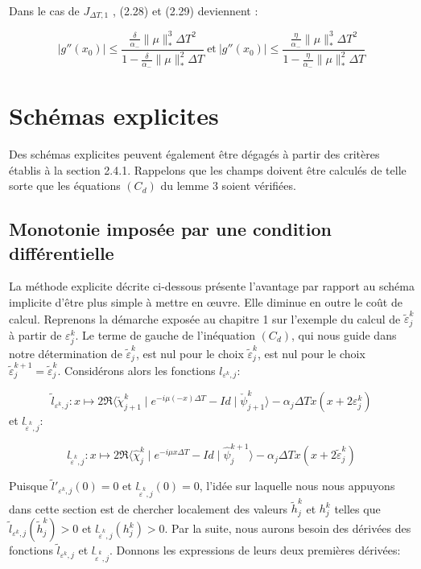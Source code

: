 Dans le cas de $ J_{\Delta T,1} $ , (2.28) et (2.29) deviennent :

$$ |g''(x_0)| \leq \frac{\frac{\delta}{\alpha_-}  \lVert \mu \rVert _*^3 \Delta T^2 }{1-\frac{\delta}{\alpha_-}  \lVert \mu \rVert _*^2 \Delta T}    \ \text{et}\    |g''(x_0)| \leq \frac{\frac{\eta}{\alpha_-} \lVert \mu \rVert _*^3 \Delta T^2 }{1-\frac{\eta}{\alpha_-} \lVert \mu \rVert _*^2 \Delta T} $$ 

\section{Schémas explicites}
Des schémas explicites peuvent également être dégagés à partir des critères établis
à la section 2.4.1. Rappelons que les champs doivent être calculés de telle sorte que les
équations $(C_d )$ du lemme 3 soient vérifiées.

\subsection{Monotonie imposée par une condition différentielle}
La méthode explicite décrite ci-dessous présente l’avantage par rapport au schéma implicite d’être plus simple à mettre en œuvre. Elle diminue en outre le coût de calcul. Reprenons la démarche exposée au chapitre 1 sur l’exemple du calcul de $\tilde{\varepsilon}_j^k$ à partir de $\varepsilon_j^k$. Le terme de gauche de l'inéquation $(C_d)$, qui nous guide dans notre détermination de $\tilde{\varepsilon}_j^k$, est nul pour le choix $\tilde{\varepsilon}_j^k$, est nul pour le choix $\tilde{\varepsilon}_j^{k+1} = \tilde{\varepsilon}_j^k$. Considérons alors les fonctions $l_{\varepsilon^k,j}$:

$$ \tilde{l}_{\varepsilon^k,j}: x \mapsto 2\mathfrak{R} \langle \check{\chi}_{j+1}^k \mid e^{-i\mu(-x)\Delta T}-Id \mid \check{\psi}_{j+1}^k\rangle - \alpha_j \Delta Tx(x+2\varepsilon_j^k)$$
et $l_{\tilde{\varepsilon}^k,j}$:

$$ l_{\tilde{\varepsilon}^k,j}: x \mapsto 2\mathfrak{R} \langle \widehat{\chi}_{j}^k \mid e^{-i\mu x\Delta T}-Id \mid \widehat{\psi}_{j}^{k+1}\rangle - \alpha_j \Delta Tx(x+2 \tilde{\varepsilon}_j^k)$$

Puisque  $\tilde{l}'_{\varepsilon^k,j}(0) = 0$ et $l_{\tilde{\varepsilon}^k,j}(0)=0$, l'idée sur laquelle nous nous appuyons dans cette section est de chercher localement des valeurs  $\tilde{h}_j^k$ et $h_j^k$ telles que $\tilde{l}_{\varepsilon^k,j}(\tilde{h}_j^k) >0$ et $l_{\tilde{\varepsilon}^k,j}(h_j^k)>0$. Par la suite, nous aurons besoin des dérivées des fonctions $\tilde{l}_{\varepsilon^k,j}$ et $l_{\tilde{\varepsilon}^k,j}$. Donnons les expressions de leurs deux premières dérivées:

